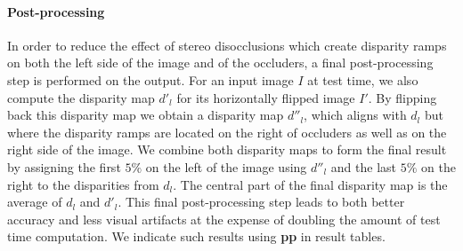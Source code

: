 \documentclass[10pt,twocolumn,letterpaper]{article}
\begin{document}
\paragraph{Post-processing} In order to reduce the effect of stereo disocclusions which create disparity ramps on both the left side of the image and of the occluders, a final post-processing step is performed on the output. 
For an input image $I$ at test time, we also compute the disparity map $d'_l$ for its horizontally flipped image $I'$. 
By flipping back this disparity map we obtain a disparity map $d''_l$, which aligns with $d_l$ but where the disparity ramps are located on the right of occluders as well as on the right side of the image. 
We combine both disparity maps to form the final result by assigning the first $5\%$ on the left of the image using $d''_l$ and the last $5\%$ on the right to the disparities from $d_l$. 
The central part of the final disparity map is the average of $d_l$ and $d'_l$. 
This final post-processing step leads to both better accuracy and less visual artifacts at the expense of doubling the amount of test time computation. We indicate such results using \textbf{pp} in result tables.
\end{document}
